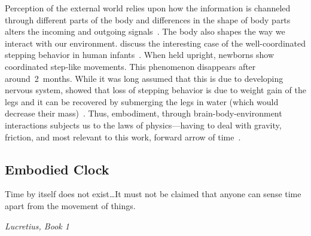Perception of the external world relies upon how the information is channeled through different parts of the body and differences in the shape of body parts alters the incoming and outgoing signals~\cite{Gomez2019Neuron}.
The body also shapes the way we interact with our environment.
 discuss the interesting case of the well-coordinated stepping behavior in human infants~\cite{Gomez2019Neuron}.
When held upright, newborns show coordinated step-like movements.
This phenomenon disappears after around~2~months.
While it was long assumed that this is due to developing nervous system, \citeauthor{Thelen1984InfBeh} showed that loss of stepping behavior is due to weight gain of the legs and it can be recovered by submerging the legs in water (which would decrease their mass)~\cite{Thelen1984InfBeh}.
Thus, embodiment, through brain-body-environment interactions subjects us to the laws of physics---having to deal with gravity, friction, and most relevant to this work, forward arrow of time~\cite{Pfeifer2006Book}.


\subsection{Embodied Clock}
\label{ch:intro:Embodiment:Embodied Clock}
\epigraph{Time by itself does not exist\ldots It must not be claimed that anyone can sense time apart from the movement of things.}
{\textit{Lucretius, Book 1}}
\noindent





